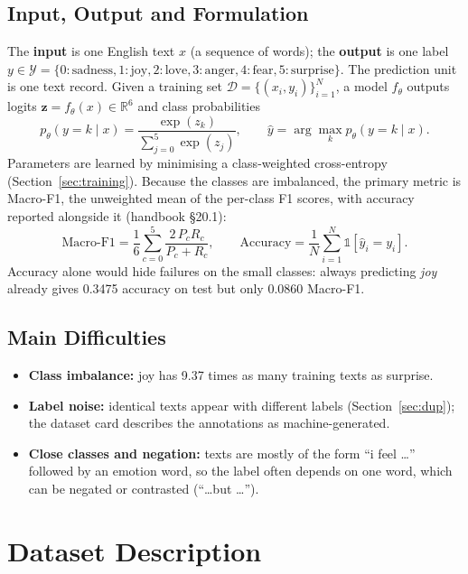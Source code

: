 \documentclass[11pt,a4paper]{article}
\begin{document}
\subsection{Input, Output and Formulation}
The \textbf{input} is one English text $x$ (a sequence of words); the \textbf{output} is one label $y \in \mathcal{Y}=\{0{:}\text{sadness},1{:}\text{joy},2{:}\text{love},3{:}\text{anger},4{:}\text{fear},5{:}\text{surprise}\}$. The prediction unit is one text record. Given a training set $\mathcal{D}=\{(x_i,y_i)\}_{i=1}^{N}$, a model $f_\theta$ outputs logits $\mathbf{z}=f_\theta(x)\in\mathbb{R}^{6}$ and class probabilities
\begin{equation}
p_\theta(y=k\mid x)=\frac{\exp(z_k)}{\sum_{j=0}^{5}\exp(z_j)},\qquad \hat{y}=\arg\max_k p_\theta(y=k\mid x).
\end{equation}
Parameters are learned by minimising a class-weighted cross-entropy (Section~\ref{sec:training}). Because the classes are imbalanced, the primary metric is Macro-F1, the unweighted mean of the per-class F1 scores, with accuracy reported alongside it (handbook \S20.1):
\begin{equation}
\text{Macro-F1}=\frac{1}{6}\sum_{c=0}^{5}\frac{2\,P_c R_c}{P_c+R_c},\qquad
\text{Accuracy}=\frac{1}{N}\sum_{i=1}^{N}\mathbb{1}[\hat{y}_i=y_i].
\end{equation}
Accuracy alone would hide failures on the small classes: always predicting \emph{joy} already gives 0.3475 accuracy on test but only 0.0860 Macro-F1.

\subsection{Main Difficulties}
\begin{itemize}
  \item \textbf{Class imbalance:} joy has 9.37 times as many training texts as surprise.
  \item \textbf{Label noise:} identical texts appear with different labels (Section~\ref{sec:dup}); the dataset card describes the annotations as machine-generated.
  \item \textbf{Close classes and negation:} texts are mostly of the form ``i feel \ldots'' followed by an emotion word, so the label often depends on one word, which can be negated or contrasted (``\ldots but \ldots'').
\end{itemize}

\section{Dataset Description}
\end{document}
